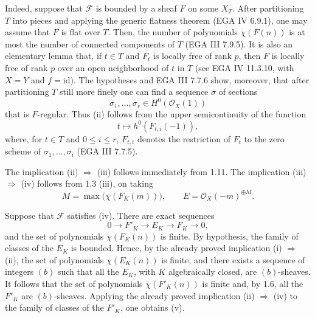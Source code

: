 Indeed, suppose that \(\mathcal F\) is bounded by a sheaf \(F\) on some
\(X_T\). After partitioning \(T\) into pieces and applying the generic
flatness theorem (EGA IV 6.9.1), one may assume that \(F\) is flat over
\(T\). Then,
the number of polynomials \(\chi(F(n))\) is at most the number of connected
components of \(T\) (EGA III 7.9.5). It is also an elementary lemma that,
if \(t\in T\) and \(F_t\) is locally free of rank \(p\), then \(F\) is
locally free of rank \(p\) over an open neighborhood of \(t\) in \(T\)
(see EGA IV 11.3.10, with \(X=Y\) and \(f=\mathrm{id}\)). The hypotheses
and EGA III 7.7.6 show, moreover, that after partitioning \(T\) still more
finely one can find a sequence \(\sigma\) of sections
\[
\sigma_1,\ldots,\sigma_r\in H^0(\mathcal O_X(1))
\]
that is \(F\)-regular. Thus (ii) follows from the upper semicontinuity of
the function
\[
t\longmapsto h^0(F_{t,i}(-1)),
\]
where, for \(t\in T\) and \(0\le i\le r\), \(F_{t,i}\) denotes the
restriction of \(F_t\) to the zero scheme of
\(\sigma_1,\ldots,\sigma_i\) (EGA III 7.7.5).

The implication (ii) \(\Rightarrow\) (iii) follows immediately from 1.11.
The implication (iii) \(\Rightarrow\) (iv) follows from 1.3 (iii), on
taking
\[
M=\max\bigl(\chi(F_K(m))\bigr),
\qquad E=\mathcal O_X(-m)^{\oplus M}.
\]

Suppose that \(\mathcal F\) satisfies (iv). There are exact sequences
\[
0\longrightarrow F'_K\longrightarrow E_K\longrightarrow F_K
\longrightarrow0,
\]
and the set of polynomials \(\chi(F_K(n))\) is finite. By hypothesis, the
family of classes of the \(E_K\) is bounded. Hence, by the already proved
implication (i) \(\Rightarrow\) (ii), the set of polynomials
\(\chi(E_K(n))\) is finite, and there exists a sequence of integers \((b)\)
such that all the \(E_K\), with \(K\) algebraically closed, are
\((b)\)-sheaves. It follows that the set of polynomials
\(\chi(F'_K(n))\) is finite and, by 1.6, all the \(F'_K\) are
\((b)\)-sheaves. Applying the already proved implication (ii)
\(\Rightarrow\) (iv) to the family of classes of the \(F'_K\), one obtains
(v).

